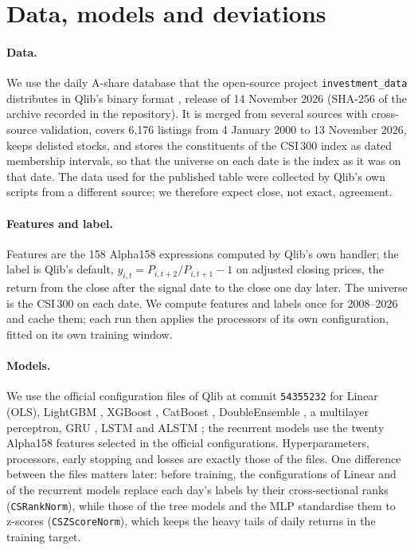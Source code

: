\documentclass[11pt]{article}
\begin{document}
\section{Data, models and deviations}\label{sec:setup}

\paragraph{Data.}
We use the daily A-share database that the open-source project \texttt{investment\_data} distributes in Qlib's binary format \citep{chendi2026data}, release of 14 November 2026 (SHA-256 of the archive recorded in the repository).
It is merged from several sources with cross-source validation, covers 6{,}176 listings from 4 January 2000 to 13 November 2026, keeps delisted stocks, and stores the constituents of the CSI\,300 index as dated membership intervals, so that the universe on each date is the index as it was on that date.
The data used for the published table were collected by Qlib's own scripts from a different source; we therefore expect close, not exact, agreement.

\paragraph{Features and label.}
Features are the 158 Alpha158 expressions computed by Qlib's own handler; the label is Qlib's default, $y_{i,t}=P_{i,t+2}/P_{i,t+1}-1$ on adjusted closing prices, the return from the close after the signal date to the close one day later.
The universe is the CSI\,300 on each date.
We compute features and labels once for 2008--2026 and cache them; each run then applies the processors of its own configuration, fitted on its own training window.

\paragraph{Models.}
We use the official configuration files of Qlib at commit \texttt{54355232} for Linear (OLS), LightGBM \citep{ke2017lightgbm}, XGBoost \citep{chen2016xgboost}, CatBoost \citep{prokhorenkova2018catboost}, DoubleEnsemble \citep{zhang2020doubleensemble}, a multilayer perceptron, GRU \citep{cho2014learning}, LSTM \citep{hochreiter1997long} and ALSTM \citep{qin2017dual}; the recurrent models use the twenty Alpha158 features selected in the official configurations.
Hyperparameters, processors, early stopping and losses are exactly those of the files.
One difference between the files matters later: before training, the configurations of Linear and of the recurrent models replace each day's labels by their cross-sectional ranks (\texttt{CSRankNorm}), while those of the tree models and the MLP standardise them to z-scores (\texttt{CSZScoreNorm}), which keeps the heavy tails of daily returns in the training target.
\end{document}
